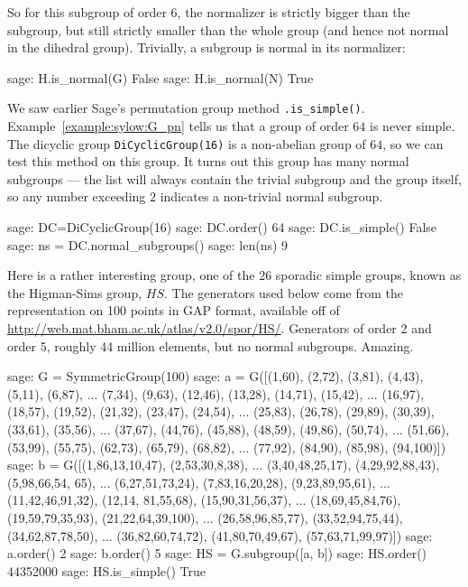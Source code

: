 %
So for this subgroup of order $6$, the normalizer is strictly bigger than the subgroup, but still strictly smaller than the whole group (and hence not normal in the dihedral group).  Trivially, a subgroup is normal in its normalizer:
%
\begin{sageexample}
sage: H.is_normal(G)
False
sage: H.is_normal(N)
True
\end{sageexample}
%
%
We saw earlier Sage's permutation group method \verb?.is_simple()?.  Example~\ref{example:sylow:G_pn} tells us that a group of order $64$ is never simple.  The dicyclic group \verb?DiCyclicGroup(16)? is a non-abelian group of $64$, so we can test this method on this group.  It turns out this group has many normal subgroups --- the list will always contain the trivial subgroup and the group itself, so any number exceeding $2$ indicates a non-trivial normal subgroup.
%
\begin{sageexample}
sage: DC=DiCyclicGroup(16)
sage: DC.order()
64
sage: DC.is_simple()
False
sage: ns = DC.normal_subgroups()
sage: len(ns)
9
\end{sageexample}
%
Here is a rather interesting group, one of the 26 sporadic simple groups, known as the Higman-Sims group, $HS$.  The generators used below come from the representation on 100 points in GAP format, available off of \url{http://web.mat.bham.ac.uk/atlas/v2.0/spor/HS/}.  Generators of order 2 and order 5, roughly 44 million elements, but no normal subgroups.  Amazing.
%
\begin{sageexample}
sage: G = SymmetricGroup(100)
sage: a = G([(1,60),  (2,72),  (3,81),  (4,43),  (5,11),  (6,87),
...          (7,34),  (9,63),  (12,46), (13,28), (14,71), (15,42),
...          (16,97), (18,57), (19,52), (21,32), (23,47), (24,54),
...          (25,83), (26,78), (29,89), (30,39), (33,61), (35,56),
...          (37,67), (44,76), (45,88), (48,59), (49,86), (50,74),
...          (51,66), (53,99), (55,75), (62,73), (65,79), (68,82),
...          (77,92), (84,90), (85,98), (94,100)])
sage: b = G([(1,86,13,10,47),  (2,53,30,8,38),
...          (3,40,48,25,17),  (4,29,92,88,43),   (5,98,66,54, 65),
...          (6,27,51,73,24),  (7,83,16,20,28),   (9,23,89,95,61),
...          (11,42,46,91,32), (12,14, 81,55,68), (15,90,31,56,37),
...          (18,69,45,84,76), (19,59,79,35,93),  (21,22,64,39,100),
...          (26,58,96,85,77), (33,52,94,75,44),  (34,62,87,78,50),
...          (36,82,60,74,72), (41,80,70,49,67),  (57,63,71,99,97)])
sage: a.order()
2
sage: b.order()
5
sage: HS = G.subgroup([a, b])
sage: HS.order()
44352000
sage: HS.is_simple()
True
\end{sageexample}
